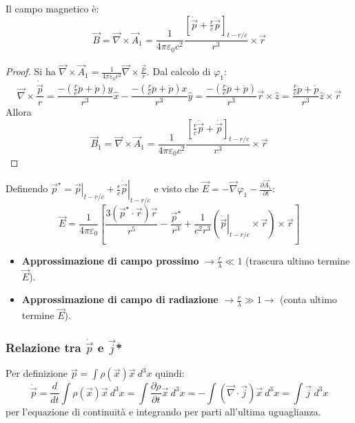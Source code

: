 \documentclass[a4paper]{scrartcl}
\newcommand*\Eval[3]{\left.#1\right\rvert_{#2}^{#3}}
\numberwithin{equation}{subsection}
\theoremstyle{style1}
\newenvironment{boxenv}[1][]{
    \begin{eqbox}[#1]
    }{
   \end{eqbox}
}
\begin{document}
\noindent Il campo magnetico \`e:
\begin{equation}
	\vec{B}=\vec{\nabla }\times \vec{A}_1 = \frac{1}{4\pi \varepsilon _0 c^2} \frac{\left[ \dot{\vec{p}}+\frac{r}{c}\ddot{\vec{p}} \right] _{t - r /c} }{r^3} \times \vec{r}
\end{equation}
\begin{boxenv}[]
\begin{proof}
	Si ha $\vec{\nabla }\times \vec{A}_1 = \frac{1}{4\pi \varepsilon _0 c^2} \vec{\nabla }\times \frac{\dot{\vec{p}}}{r}$. Dal calcolo di $\varphi _1$:
	\[
	\vec{\nabla }\times \frac{\dot{\vec{p}}}{r} = \frac{-\left(\frac{r}{c}\ddot{p} + \dot{p}\right)y }{r^3}\hat{x} - \frac{-\left(\frac{r}{c}\ddot{p} + \dot{p}\right)x }{r^3}\hat{y} = \frac{-\left(\frac{r}{c}\ddot{p} + \dot{p}\right) }{r^3}\vec{r}\times \hat{z} =\frac{\frac{r}{c}\ddot{p} + \dot{p}}{r^3} \hat{z} \times \vec{r}
	\] 
	Allora
	\begin{equation}
		\vec{B}_1 = \vec{\nabla }\times \vec{A}_1 = \frac{1}{4\pi \varepsilon _0 c^2} \frac{\left[ \frac{r}{c}\ddot{\vec{p}} + \dot{\vec{p}} \right] _{t - r / c} }{r^3}\times \vec{r}
	\end{equation}
\end{proof}
\end{boxenv}
\noindent Definendo $\vec{p}^\star = \Eval{\vec{p}}{t - r / c}{} + \frac{r}{c}\Eval{\dot{\vec{p}}}{t - r /c}{}$ e visto che $\vec{E}=-\vec{\nabla }\varphi _1 - \frac{\partial \vec{A}_1}{\partial t} $:
\begin{equation}
	\vec{E}=\frac{1}{4\pi \varepsilon _0} \left[ \frac{3(\vec{p}^\star \cdot \vec{r})\vec{r}}{r^5} - \frac{\vec{p}^\star}{r^3} + \frac{1}{c^2 r^3}\left(\Eval{\ddot{\vec{p}}}{t - r /c}{}\times \vec{r}\right) \times \vec{r} \right] 
\end{equation}
\begin{itemize}
	\item \textbf{Approssimazione di campo prossimo}  $\to \frac{r}{\lambda }\ll 1$ (trascura ultimo termine $\vec{E}$).
		\item\textbf{Approssimazione di campo di radiazione} $\to \frac{r}{\lambda }\gg 1 \to$ (conta ultimo termine $\vec{E}$).
\end{itemize}
\subsubsection{Relazione tra $\dot{\vec{p}}$ e $\vec{j}$*}
Per definizione $\vec{p}=\int \rho (\vec{x}) \vec{x} \ d^3 x$ quindi: 
\begin{equation}
\dot{\vec{p}}= \frac{d }{d t} \int \rho (\vec{x}) \vec{x}\ d^3 x =  \int \frac{\partial \rho }{\partial t} \vec{x}\ d^3 x = - \int (\vec{\nabla }\cdot \vec{j}) \vec{x}\ d^3 x = \int \vec{j}\ d^3 x 
\end{equation}
per l'equazione di continuit\`a e integrando per parti all'ultima uguaglianza.
\end{document}

